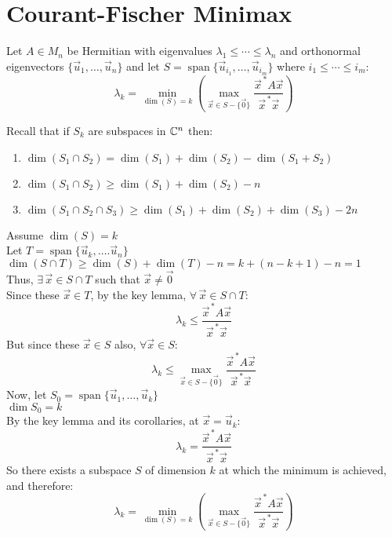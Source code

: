 \documentclass[letterpaper,12pt,fleqn]{article}
\newcommand{\vx}{\vec{x}}
\newcommand{\vxct}{\vx^{\,*}}
\newcommand{\vz}{\vec{0}}
\newcommand{\vu}{\vec{u}}
\renewcommand{\ss}{S-\{\vz\}}
\renewcommand{\l}{\lambda}
\newcommand{\rr}{\frac{\vxct A\vx}{\vxct\vx}}
\DeclareMathOperator{\spn}{span}
\begin{document}
\section*{Courant-Fischer Minimax}

\begin{theorem}
  Let $A\in M_n$ be Hermitian with eigenvalues $\l_1\le\cdots\le\l_n$ and
  orthonormal eigenvectors $\{\vu_1,\ldots,\vu_n\}$ and let
  $S=\spn\{\vu_{i_1},\ldots,\vu_{i_m}\}$ where $i_1\le\cdots\le i_m$:
  \[\l_k=\min_{\dim(S)=k}\left(\max_{\vx\in\ss}\rr\right)\]
\end{theorem}

Recall that if $S_k$ are subspaces in $\mathbb{C}^n$ then:
\begin{enumerate}
\item $\dim(S_1\cap S_2)=\dim(S_1)+\dim(S_2)-\dim(S_1+S_2)$
\item $\dim(S_1\cap S_2)\ge\dim(S_1)+\dim(S_2)-n$
\item $\dim(S_1\cap S_2\cap S_3)\ge\dim(S_1)+\dim(S_2)+\dim(S_3)-2n$
\end{enumerate}

\begin{theproof}
  Assume $\dim(S)=k$ \\
  Let $T=\spn\{\vu_k,\ldots.\vu_n\}$ \\
  $\dim(S\cap T)\ge\dim(S)+\dim(T)-n=k+(n-k+1)-n=1$ \\
  Thus, $\exists\,\vx\in S\cap T$ such that $\vx\ne\vz$ \\
  Since these $\vx\in T$, by the key lemma, $\forall\,\vx\in S\cap T$:
  \[\l_k\le\rr\]
  But since these $\vx\in S$ also, $\forall\vx\in S$:
  \[\l_k\le\max_{\vx\in\ss}\rr\]
  Now, let $S_0=\spn\{\vu_1,\ldots,\vu_k\}$ \\
  $\dim{S_0}=k$ \\
  By the key lemma and its corollaries, at $\vx=\vu_k$:
  \[\l_k=\rr\]
  So there exists a subspace $S$ of dimension $k$ at which the minimum is achieved, and
  therefore:
  \[\l_k=\min_{\dim(S)=k}\left(\max_{\vx\in\ss}\rr\right)\]
\end{theproof}
\end{document}
